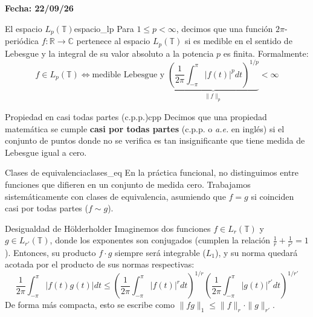 \textbf{Fecha: 22/09/26}

\begin{definicion}{El espacio $L_p(\mathbb{T})$}{espacio_lp}
Para $1 \le p < \infty$, decimos que una función $2\pi$-periódica $f:\mathbb{R} \to \mathbb{C}$ pertenece al espacio $L_p(\mathbb{T})$ si es medible en el sentido de Lebesgue y la integral de su valor absoluto a la potencia $p$ es finita. Formalmente:
\begin{equation*}
    f \in L_p(\mathbb{T}) \iff \text{medible Lebesgue y } \underbrace{\left( \frac{1}{2\pi} \int_{-\pi}^{\pi} |f(t)|^p dt \right)^{1/p}}_{\|f\|_p} < \infty
\end{equation*}



\end{definicion}

\begin{nota}{Propiedad en casi todas partes (c.p.p.)}{cpp}
Decimos que una propiedad matemática se cumple \textbf{casi por todas partes} (c.p.p. o \textit{a.e.} en inglés) si el conjunto de puntos donde no se verifica es tan insignificante que tiene medida de Lebesgue igual a cero.
\end{nota}

\begin{observacion}{Clases de equivalencia}{clases_eq}
En la práctica funcional, no distinguimos entre funciones que difieren en un conjunto de medida cero. Trabajamos sistemáticamente con clases de equivalencia, asumiendo que $f = g$ si coinciden casi por todas partes ($f \sim g$).
\end{observacion}

\begin{teorema}{Desigualdad de Hölder}{holder}
Imaginemos dos funciones $f \in L_r(\mathbb{T})$ y $g \in L_{r'}(\mathbb{T})$, donde los exponentes son conjugados (cumplen la relación $\frac{1}{r} + \frac{1}{r'} = 1$). Entonces, su producto $f \cdot g$ siempre será integrable ($L_1$), y su norma quedará acotada por el producto de sus normas respectivas:
\begin{equation*}
    \frac{1}{2\pi} \int_{-\pi}^{\pi} |f(t)g(t)| dt \le \left( \frac{1}{2\pi} \int_{-\pi}^{\pi} |f(t)|^r dt \right)^{1/r} \left( \frac{1}{2\pi} \int_{-\pi}^{\pi} |g(t)|^{r'} dt \right)^{1/r'}
\end{equation*}
De forma más compacta, esto se escribe como $\|fg\|_1 \le \|f\|_r \cdot \|g\|_{r'}$.
\end{teorema}

